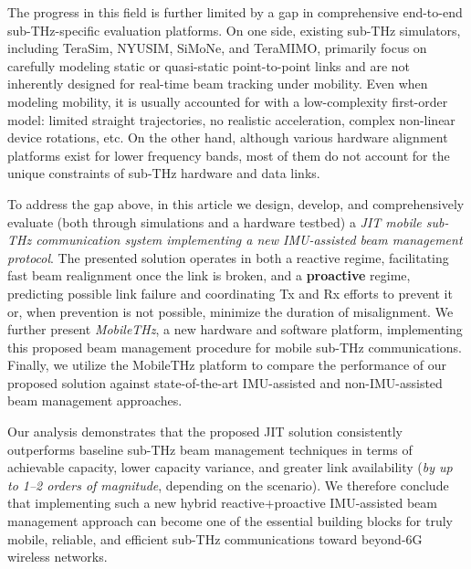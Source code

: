 \documentclass[fleqn,10pt]{wlscirep}
\begin{document}
The progress in this field is further limited by a gap in comprehensive end-to-end sub-THz-specific evaluation platforms. On one side, existing sub-THz simulators, including TeraSim\cite{HOSSAIN2019100004}, NYUSIM\cite{10367974}, SiMoNe\cite{rose2015simone, eckhardt2022modular}, and TeraMIMO\cite{tarboush2021teramimo, bodet2023directional}, primarily focus on carefully modeling static or quasi-static point-to-point links and are not inherently designed for real-time beam tracking under mobility\cite{Petrov2023Mobile}. Even when modeling mobility, it is usually accounted for with a low-complexity first-order model: limited straight trajectories, no realistic acceleration, complex non-linear device rotations, etc. On the other hand, although various hardware alignment platforms exist for lower frequency bands\cite{Abdulwahab2020, Keshavamurthy2022, AlAkkoumi2008}, most of them do not account for the unique constraints of sub-THz hardware and data links.

To address the gap above, in this article we design, develop, and comprehensively evaluate (both through simulations and a hardware testbed) a \emph{JIT mobile sub-THz communication system implementing a new IMU-assisted beam management protocol}. The presented solution operates in both a reactive regime, facilitating fast beam realignment once the link is broken, and a \textbf{proactive} regime, predicting possible link failure and coordinating Tx and Rx efforts to prevent it or, when prevention is not possible, minimize the duration of misalignment. We further present \emph{MobileTHz}, a new hardware and software platform, implementing this proposed beam management procedure for mobile sub-THz communications. Finally, we utilize the MobileTHz platform to compare the performance of our proposed solution against state-of-the-art IMU-assisted and non-IMU-assisted beam management approaches.

Our analysis demonstrates that the proposed JIT solution consistently outperforms baseline sub-THz beam management techniques in terms of achievable capacity, lower capacity variance, and greater link availability (\emph{by up to 1--2 orders of magnitude}, depending on the scenario). We therefore conclude that implementing such a new hybrid reactive+proactive IMU-assisted beam management approach can become one of the essential building blocks for truly mobile, reliable, and efficient sub-THz communications toward beyond-6G wireless networks.


\end{document}
